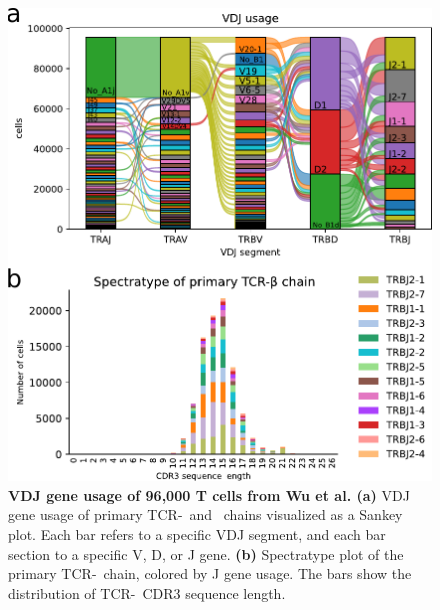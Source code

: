 \documentclass{article}
\begin{document}
\newpage
\begin{figure}[!ht]
  \centering
  \includegraphics[width=7in]{../figures/gene_usage.pdf}
  \caption{\textbf{VDJ gene usage of 96,000 T cells from Wu et al. \cite{Wu2020-vp}} \textbf{(a)} VDJ gene usage of primary TCR-\textalpha\ and \textbeta\ chains visualized as a Sankey plot. Each bar refers to a specific VDJ segment, and each bar section to a specific V, D, or J gene. \textbf{(b)} Spectratype plot of the primary TCR-\textbeta\ chain, colored by J gene usage. The bars show the distribution of TCR-\textbeta\ CDR3 sequence length.}
\end{figure}
\end{document}

